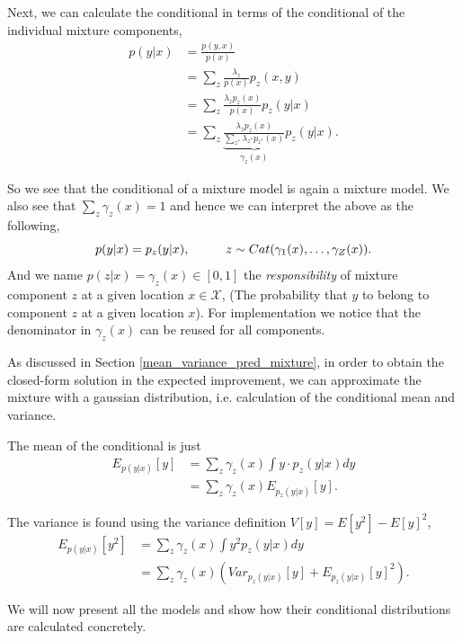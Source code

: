 Next, we can calculate the conditional in terms of the conditional of the individual mixture
components, 
\begin{align*}
    p(y|x) &= \frac{p(y,x)}{p(x)}\\
    &= \sum_{z} \frac{\lambda_z}{p(x)} p_z(x,y)\\
    &=  \sum_{z}  \frac{\lambda_z p_z(x)}{p(x)}p_z(y|x)\\
    &=  \sum_{z}  \underbrace{ \frac{\lambda_z p_z(x)}{\sum_{z^*} \lambda_{z^*} p_{z^*}(x)}}_{\gamma_z(x)} p_z(y|x).
\end{align*}

So we see that the conditional of a mixture model is again a mixture model. 
We also see that $\sum_z \gamma_z(x) = 1$ and hence we can interpret the above as the following, 
$$p(y|x) = p_z(y|x),  \hspace*{1cm} z \sim Cat(\gamma_1(x), \dots, \gamma_Z(x)).$$ And we name
$p(z|x) = \gamma_z(x) \in [0,1]$ the \textit{responsibility} of mixture component $z$ at a given
location $x \in \mathcal{X}$, (The probability that $y$ to belong to component $z$ at a given
location $x$). For implementation we notice that the denominator in $\gamma_z(x)$ can be reused for
all components. 

\begin{testexample}
    As discussed in Section \ref{mean_variance_pred_mixture}, in order to obtain the closed-form
    solution in the expected improvement, we can approximate the  mixture with a gaussian distribution, 
    i.e. calculation of the conditional mean and variance. 

    The mean of the conditional is just
    \begin{align*}
        E_{p(y|x)}[y] &= \sum_{z} \gamma_z(x) \int y \cdot p_z(y|x)dy \\
        &= \sum_{z} \gamma_z(x) E_{ p_z(y|x)}[y].
    \end{align*}

    The variance is found using the variance definition $V[y] = E[y^2] - E[y]^2$, 
    \begin{align*}
        E_{p(y|x)}[y^2] &= \sum_{z} \gamma_z(x) \int  y^2 p_{z}(y|x) dy \\
        &= \sum_{z} \gamma_z(x) (Var_{ p_z(y|x)}[y]+E_{ p_z(y|x)}[y]^2).
    \end{align*}
\end{testexample}



We will now present all the models and show how their conditional distributions are calculated concretely.

